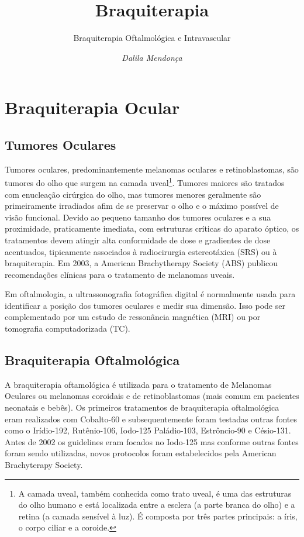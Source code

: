\documentclass[11pt,a4paper]{article}
\title{\LobsterTwo\Huge{Braquiterapia}}
\author{\LobsterTwo\Large{Braquiterapia Oftalmológica e Intravascular\nocite{*}}}
\date{\LobsterTwo\textit{Dalila Mendonça}}
\begin{document}
	\maketitle

\section{Braquiterapia Ocular}

\subsection*{Tumores Oculares}

    Tumores oculares, predominantemente melanomas oculares e retinoblastomas, são tumores do olho que surgem na camada uveal\footnote{A camada uveal, também conhecida como trato uveal, é uma das estruturas do olho humano e está localizada entre a esclera (a parte branca do olho) e a retina (a camada sensível à luz). É composta por três partes principais: a íris, o corpo ciliar e a coroide.}. Tumores maiores são tratados com enucleação cirúrgica do olho, mas tumores menores geralmente são primeiramente irradiados afim de se preservar o olho e o máximo possível de visão funcional. Devido ao pequeno tamanho dos tumores oculares e a sua proximidade, praticamente imediata, com estruturas críticas do aparato óptico, os tratamentos devem atingir alta conformidade de dose e gradientes de dose acentuados, tipicamente associados à radiocirurgia estereotáxica (SRS) ou à braquiterapia. Em 2003, a American Brachytherapy Society (ABS) publicou recomendações clínicas para o tratamento de melanomas uveais.
    
    Em oftalmologia, a ultrassonografia fotográfica digital é normalmente usada para identificar a posição dos tumores oculares e medir sua dimensão. Isso pode ser complementado por um estudo de ressonância magnética (MRI) ou por tomografia computadorizada (TC).

\subsection*{Braquiterapia Oftalmológica}


    A braquiterapia oftamológica é utilizada para o tratamento de Melanomas Oculares ou melanomas coroidais e de retinoblastomas (mais comum em pacientes neonatais e bebês). Os primeiros tratamentos de braquiterapia oftalmológica eram realizados com Cobalto-60 e subsequentemente foram testadas outras fontes como o Irídio-192, Rutênio-106, Iodo-125  Paládio-103, Estrôncio-90 e Césio-131.  Antes de 2002 os guidelines eram focados no Iodo-125 mas conforme outras fontes foram sendo utilizadas, novos protocolos foram estabelecidos pela American Brachyterapy Society. 
    
\end{document}
